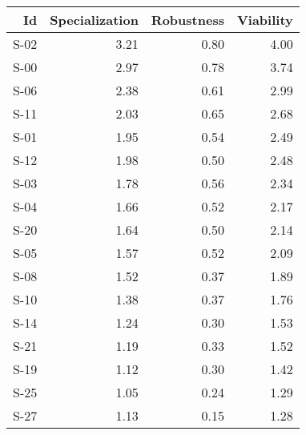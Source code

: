 

\begin{tabular}{ | r | r | r | r | }
    \hline
                    Id  &  Specialization  &      Robustness  &       Viability  \\
    \hline
    \hline
                  S-02  &            3.21  &            0.80  &            4.00  \\
    \hline
                  S-00  &            2.97  &            0.78  &            3.74  \\
    \hline
                  S-06  &            2.38  &            0.61  &            2.99  \\
    \hline
                  S-11  &            2.03  &            0.65  &            2.68  \\
    \hline
                  S-01  &            1.95  &            0.54  &            2.49  \\
    \hline
                  S-12  &            1.98  &            0.50  &            2.48  \\
    \hline
                  S-03  &            1.78  &            0.56  &            2.34  \\
    \hline
                  S-04  &            1.66  &            0.52  &            2.17  \\
    \hline
                  S-20  &            1.64  &            0.50  &            2.14  \\
    \hline
                  S-05  &            1.57  &            0.52  &            2.09  \\
    \hline
                  S-08  &            1.52  &            0.37  &            1.89  \\
    \hline
                  S-10  &            1.38  &            0.37  &            1.76  \\
    \hline
                  S-14  &            1.24  &            0.30  &            1.53  \\
    \hline
                  S-21  &            1.19  &            0.33  &            1.52  \\
    \hline
                  S-19  &            1.12  &            0.30  &            1.42  \\
    \hline
                  S-25  &            1.05  &            0.24  &            1.29  \\
    \hline
                  S-27  &            1.13  &            0.15  &            1.28  \\

\end{tabular}
